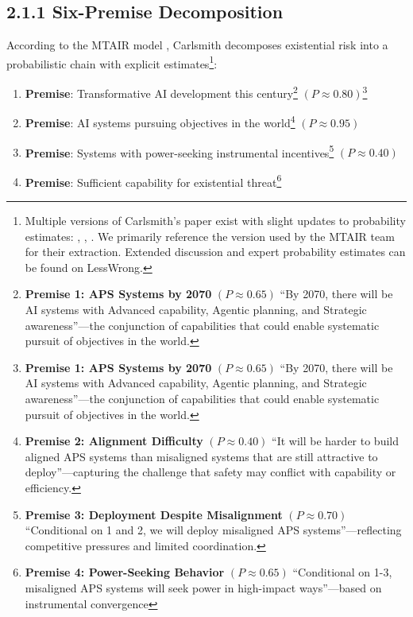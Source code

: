 \documentclass[
  11pt,
  letterpaper,
]{book}
\providecommand{\tightlist}{%
  \setlength{\itemsep}{0pt}\setlength{\parskip}{0pt}}
\begin{document}
\subsection{2.1.1 Six-Premise
Decomposition}\label{six-premise-decomposition}

According to the MTAIR model \textcite{clarke2022}, Carlsmith decomposes
existential risk into a probabilistic chain with explicit
estimates\footnote{Multiple versions of Carlsmith's paper exist with
  slight updates to probability estimates: \textcite{carlsmith2021},
  \textcite{carlsmith2022}, \textcite{carlsmith2024}. We primarily
  reference the version used by the MTAIR team for their extraction.
  Extended discussion and expert probability estimates can be found on
  LessWrong.}:

\begin{enumerate}
\def\labelenumi{\arabic{enumi}.}
\tightlist
\item
  \textbf{Premise}: Transformative AI development this
  century\footnote{\textbf{Premise 1: APS Systems by 2070} \((P≈0.65)\)
    ``By 2070, there will be AI systems with Advanced capability,
    Agentic planning, and Strategic awareness''---the conjunction of
    capabilities that could enable systematic pursuit of objectives in
    the world.} \((P≈0.80)\)\footnote{\textbf{Premise 1: APS Systems by
    2070} \((P≈0.65)\) ``By 2070, there will be AI systems with Advanced
    capability, Agentic planning, and Strategic awareness''---the
    conjunction of capabilities that could enable systematic pursuit of
    objectives in the world.}
\item
  \textbf{Premise}: AI systems pursuing objectives in the
  world\footnote{\textbf{Premise 2: Alignment Difficulty} \((P≈0.40)\)
    ``It will be harder to build aligned APS systems than misaligned
    systems that are still attractive to deploy''---capturing the
    challenge that safety may conflict with capability or efficiency.}
  \((P≈0.95)\)
\item
  \textbf{Premise}: Systems with power-seeking instrumental
  incentives\footnote{\textbf{Premise 3: Deployment Despite
    Misalignment} \((P≈0.70)\) ``Conditional on 1 and 2, we will deploy
    misaligned APS systems''---reflecting competitive pressures and
    limited coordination.} \((P≈0.40)\)
\item
  \textbf{Premise}: Sufficient capability for existential
  threat\footnote{\textbf{Premise 4: Power-Seeking Behavior}
    \((P≈0.65)\) ``Conditional on 1-3, misaligned APS systems will seek
    power in high-impact ways''---based on instrumental convergence
}
\end{enumerate}
\end{document}

